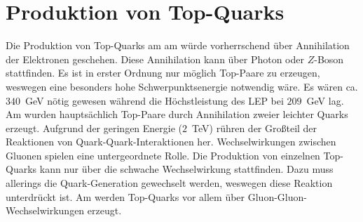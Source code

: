  \section{Produktion von Top-Quarks}
 Die Produktion von Top-Quarks am \lep am \cern würde vorherrschend über Annihilation der Elektronen geschehen. Diese Annihilation kann über Photon oder $Z$-Boson stattfinden. Es ist in erster Ordnung nur möglich Top-Paare zu erzeugen, weswegen eine besonders hohe Schwerpunktsenergie notwendig wäre. Es wären ca. $340$~GeV nötig gewesen während die Höchstleistung des LEP bei $209$~GeV lag. Am \tevatron wurden hauptsächlich Top-Paare durch Annihilation zweier leichter Quarks erzeugt. Aufgrund der geringen Energie ($2$~TeV) rühren der Großteil der Reaktionen von Quark-Quark-Interaktionen her. Wechselwirkungen zwischen Gluonen spielen eine untergeordnete Rolle. Die Produktion von einzelnen Top-Quarks kann nur über die schwache Wechselwirkung stattfinden. Dazu muss allerings die Quark-Generation gewechselt werden, weswegen diese Reaktion unterdrückt ist. 
 Am \lhc werden Top-Quarks vor allem über Gluon-Gluon-Wechselwirkungen erzeugt. 


